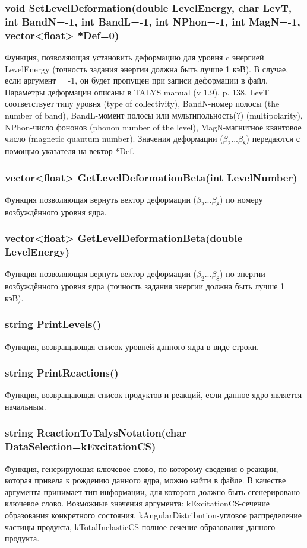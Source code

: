\documentclass[a4paper,12pt]{extarticle}
\begin{document}
\subsubsection{void SetLevelDeformation(double LevelEnergy, char LevT, int BandN=-1, int BandL=-1, int NPhon=-1, int MagN=-1, vector<float> *Def=0)}
Функция, позволяющая установить деформацию для уровня c энергией LevelEnergy (точность задания энергии должна быть лучше 1 кэВ). В случае, если аргумент = -1, он будет пропущен при записи деформации в файл. Параметры деформации описаны в TALYS manual (v 1.9), p. 138, LevT соответствует типу уровня (type of collectivity), BandN-номер полосы (the number of band), BandL-момент полосы или мультипольность(?) (multipolarity), NPhon-число фононов (phonon number of the level), MagN-магнитное квантовое число (magnetic quantum number). Значения деформации ($\beta_2...\beta_8$) передаются с помощью указателя на вектор *Def.

\subsubsection{vector<float> GetLevelDeformationBeta(int LevelNumber)}
Функция позволяющая вернуть вектор деформации ($\beta_2...\beta_8$) по номеру возбуждённого уровня ядра.
\subsubsection{vector<float> GetLevelDeformationBeta(double LevelEnergy)}
Функция позволяющая вернуть вектор деформации ($\beta_2...\beta_8$) по энергии возбуждённого уровня ядра (точность задания энергии должна быть лучше 1 кэВ).
\subsubsection{string PrintLevels()}
Функция, возвращающая список уровней данного ядра в виде строки.
\subsubsection{string PrintReactions()}
Функция, возвращающая список продуктов и реакций, если данное ядро является начальным.
\subsubsection{string ReactionToTalysNotation(char DataSelection=kExcitationCS)}
Функция, генерирующая ключевое слово, по которому сведения о реакции, которая привела к рождению данного ядра, можно найти в файле. В качестве аргумента принимает тип информации, для которого должно быть сгенерировано ключевое слово. Возможные значения аргумента: kExcitationCS-сечение образования конкретного состояния, kAngularDistribution-угловое распределение частицы-продукта, kTotalInelasticCS-полное сечение образования данного продукта.
\end{document}
